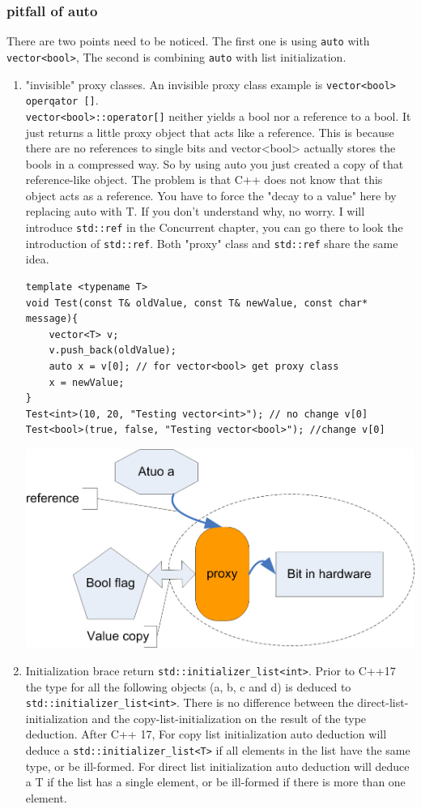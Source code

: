 \documentclass[a4paper,11pt,twoside]{book}
\begin{document}
\subsubsection{pitfall of auto}
	There are two points need to be noticed. The first one is using \texttt{auto} with \texttt{vector<bool>}, The second is combining \texttt{auto} with list initialization.
	\begin{enumerate}
		\item "invisible" proxy classes. An invisible proxy class example is \texttt{vector<bool> operqator []}. \\ \texttt{vector<bool>::operator[]} neither yields a bool nor a reference to a bool. It just returns a little proxy object that acts like a reference. This is because there are no references to single bits and vector<bool> actually stores the bools in a compressed way. So by using auto you just created a copy of that reference-like object. The problem is that C++ does not know that this object acts as a reference. You have to force the "decay to a value" here by replacing auto with T.  If you don't understand why, no worry. I will introduce \texttt{std::ref} in the Concurrent chapter, you can go there to look the introduction of \texttt{std::ref}. Both "proxy" class and \texttt{std::ref} share the same idea.
\begin{lstlisting}
template <typename T>
void Test(const T& oldValue, const T& newValue, const char* message){
	vector<T> v;
	v.push_back(oldValue);
	auto x = v[0]; // for vector<bool> get proxy class
	x = newValue;
}
Test<int>(10, 20, "Testing vector<int>"); // no change v[0]
Test<bool>(true, false, "Testing vector<bool>"); //change v[0]
\end{lstlisting}
\begin{center}
	\includegraphics[width=0.45\linewidth]{pics/auto2.png}
\end{center}

		\item Initialization brace return \texttt{std::initializer\_list<int>}. Prior to C++17 the type for all the following objects (a, b, c and d) is deduced to \texttt{std::initializer\_list<int>}. There is no difference between the direct-list-initialization and the copy-list-initialization on the result of the type deduction.  After C++ 17, For copy list initialization auto deduction will deduce a \texttt{std::initializer\_list<T>} if all elements in the list have the same type, or be ill-formed. For direct list initialization auto deduction will deduce a T if the list has a single element, or be ill-formed if there is more than one element.
		

\end{enumerate}
\end{document}
